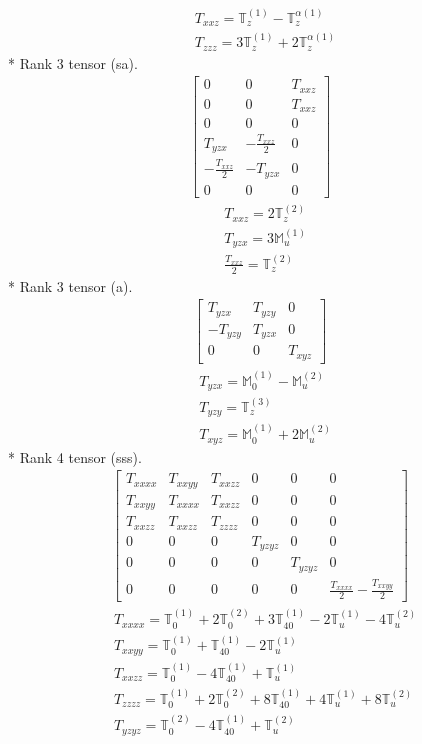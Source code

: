 \documentclass[fleqn,8pt,landscape]{jsarticle}
\begin{document}
\begin{align*}
& T_{xxz} = \mathbb{T}_{z}^{(1)} - \mathbb{T}_{z}^{\alpha(1)} \\
& T_{zzz} = 3 \mathbb{T}_{z}^{(1)} + 2 \mathbb{T}_{z}^{\alpha(1)}
\end{align*}
* Rank 3 tensor (sa).
\begin{align*}
\begin{bmatrix} 0 & 0 & T_{xxz} \\ 0 & 0 & T_{xxz} \\ 0 & 0 & 0 \\ T_{yzx} & - \frac{T_{xxz}}{2} & 0 \\ - \frac{T_{xxz}}{2} & - T_{yzx} & 0 \\ 0 & 0 & 0 \end{bmatrix}
\end{align*}
\begin{align*}
& T_{xxz} = 2 \mathbb{T}_{z}^{(2)} \\
& T_{yzx} = 3 \mathbb{M}_{u}^{(1)} \\
& \frac{T_{xxz}}{2} = \mathbb{T}_{z}^{(2)}
\end{align*}
* Rank 3 tensor (a).
\begin{align*}
\begin{bmatrix} T_{yzx} & T_{yzy} & 0 \\ - T_{yzy} & T_{yzx} & 0 \\ 0 & 0 & T_{xyz} \end{bmatrix}
\end{align*}
\begin{align*}
& T_{yzx} = \mathbb{M}_{0}^{(1)} - \mathbb{M}_{u}^{(2)} \\
& T_{yzy} = \mathbb{T}_{z}^{(3)} \\
& T_{xyz} = \mathbb{M}_{0}^{(1)} + 2 \mathbb{M}_{u}^{(2)}
\end{align*}
* Rank 4 tensor (sss).
\begin{align*}
\begin{bmatrix} T_{xxxx} & T_{xxyy} & T_{xxzz} & 0 & 0 & 0 \\ T_{xxyy} & T_{xxxx} & T_{xxzz} & 0 & 0 & 0 \\ T_{xxzz} & T_{xxzz} & T_{zzzz} & 0 & 0 & 0 \\ 0 & 0 & 0 & T_{yzyz} & 0 & 0 \\ 0 & 0 & 0 & 0 & T_{yzyz} & 0 \\ 0 & 0 & 0 & 0 & 0 & \frac{T_{xxxx}}{2} - \frac{T_{xxyy}}{2} \end{bmatrix}
\end{align*}
\begin{align*}
& T_{xxxx} = \mathbb{T}_{0}^{(1)} + 2 \mathbb{T}_{0}^{(2)} + 3 \mathbb{T}_{40}^{(1)} - 2 \mathbb{T}_{u}^{(1)} - 4 \mathbb{T}_{u}^{(2)} \\
& T_{xxyy} = \mathbb{T}_{0}^{(1)} + \mathbb{T}_{40}^{(1)} - 2 \mathbb{T}_{u}^{(1)} \\
& T_{xxzz} = \mathbb{T}_{0}^{(1)} - 4 \mathbb{T}_{40}^{(1)} + \mathbb{T}_{u}^{(1)} \\
& T_{zzzz} = \mathbb{T}_{0}^{(1)} + 2 \mathbb{T}_{0}^{(2)} + 8 \mathbb{T}_{40}^{(1)} + 4 \mathbb{T}_{u}^{(1)} + 8 \mathbb{T}_{u}^{(2)} \\
& T_{yzyz} = \mathbb{T}_{0}^{(2)} - 4 \mathbb{T}_{40}^{(1)} + \mathbb{T}_{u}^{(2)}
\end{align*}
\end{document}
